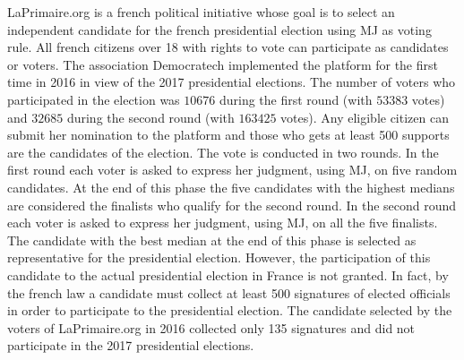 LaPrimaire.org \citep{LaPrimaire} is a french political initiative whose goal is to select an independent candidate for the french presidential election using \ac{MJ} as voting rule. All french citizens over 18 with rights to vote can participate as candidates or voters. The association Democratech implemented the platform for the first time in 2016 in view of the 2017 presidential elections. The number of voters who participated in the election was $10676$ during the first round (with $53383$ votes) and $32685$ during the second round (with $163425$ votes).
Any eligible citizen can submit her nomination to the platform and those who gets at least 500 supports are the candidates of the election. The vote is conducted in two rounds.
In the first round each voter is asked to express her judgment, using \ac{MJ}, on five random candidates. At the end of this phase the five candidates with the highest medians are considered the finalists who qualify for the second round. In the second round each voter is asked to express her judgment, using \ac{MJ}, on all the five finalists. The candidate with the best median at the end of this phase is selected as representative for the presidential election.
However, the participation of this candidate to the actual presidential election in France is not granted. In fact, by the french law a candidate must collect at least 500 signatures of elected officials in order to participate to the presidential election. The candidate selected by the voters of LaPrimaire.org in 2016 collected only 135 signatures and did not participate in the 2017 presidential elections.  
